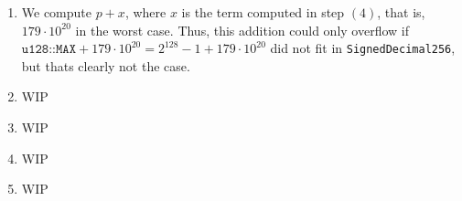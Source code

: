 \documentclass[11pt]{article}
\begin{document}
\begin{enumerate}[label=(\arabic*).]
    \item We compute $p + x$, where $x$ is the term computed in step $(4)$,
        that is, $179\cdot 10^{20}$ in the worst case. Thus, this addition
        could only overflow if $\texttt{u128::MAX} + 179\cdot 10^{20} = 2^{128}
        - 1 + 179\cdot 10^{20}$ did not fit in \texttt{SignedDecimal256}, but
        thats clearly not the case.
    \item WIP
    \item WIP
    \item WIP
    \item WIP
\end{enumerate}


\break


\end{document}
